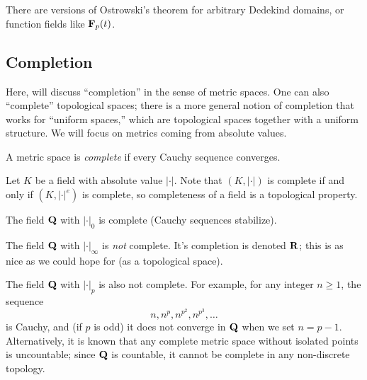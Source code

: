 There are versions of Ostrowski's theorem for arbitrary Dedekind domains, or 
function fields like $\mathbf{F}_p(t)$. 





\subsection{Completion}\label{sec:completion}

Here, will discuss ``completion'' in the sense of metric spaces. One can also 
``complete'' topological spaces; there is a more general notion of completion 
that works for ``uniform spaces,'' which are topological spaces together with a 
uniform structure. We will focus on metrics coming from absolute values. 

\begin{definition}
A metric space is \emph{complete} if every Cauchy sequence converges. 
\end{definition}

Let $K$ be a field with absolute value $|\cdot|$. Note that $(K,|\cdot|)$ is 
complete if and only if $(K,|\cdot|^e)$ is complete, so completeness of a field 
is a topological property. 

\begin{example}
The field $\mathbf{Q}$ with $|\cdot|_0$ is complete (Cauchy sequences stabilize). 
\end{example}

\begin{example}
The field $\mathbf{Q}$ with $|\cdot|_\infty$ is \emph{not} complete. It's completion 
is denoted $\mathbf{R}$; this is as nice as we could hope for (as a topological 
space). 
\end{example}

\begin{example}
The field $\mathbf{Q}$ with $|\cdot|_p$ is also not complete. For example, for any 
integer $n\geqslant 1$, the sequence 
\[
  n,n^p,n^{p^2},n^{p^3},\dots
\]
is Cauchy, and (if $p$ is odd) it does not converge in $\mathbf{Q}$ when we set 
$n=p-1$. Alternatively, it is known that any complete metric space without 
isolated points is uncountable; since $\mathbf{Q}$ is countable, it cannot be complete 
in any non-discrete topology. 
\end{example}

